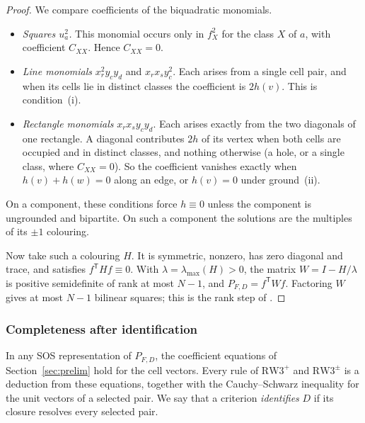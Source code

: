 \documentclass[11pt,a4paper]{article}
\theoremstyle{definition}
\newcommand{\RW}{\mathrm{RW3}^{+}}
\newcommand{\SG}{\mathrm{RW3}^{\pm}}
\begin{document}
\begin{proof}
We compare coefficients of the biquadratic monomials.
\begin{itemize}
\item \emph{Squares $u_a^2$.} This monomial occurs only in $f_X^2$ for the
      class $X$ of $a$, with coefficient $C_{XX}$. Hence $C_{XX}=0$.
\item \emph{Line monomials} $x_r^2y_cy_d$ and $x_rx_sy_c^2$. Each arises
      from a single cell pair, and when its cells lie in distinct classes
      the coefficient is $2h(v)$. This is condition~(i).
\item \emph{Rectangle monomials} $x_rx_sy_cy_d$. Each arises exactly from
      the two diagonals of one rectangle. A diagonal contributes $2h$ of its
      vertex when both cells are occupied and in distinct classes, and
      nothing otherwise (a hole, or a single class, where $C_{XX}=0$). So
      the coefficient vanishes exactly when $h(v)+h(w)=0$ along an edge,
      or $h(v)=0$ under ground~(ii).
\end{itemize}
On a component, these conditions force $h\equiv0$ unless the component is
ungrounded and bipartite. On such a component the solutions are the
multiples of its $\pm1$ colouring.

Now take such a colouring $H$. It is symmetric, nonzero, has zero diagonal
and trace, and satisfies $f^{\mathsf T}Hf\equiv0$. With
$\lambda=\lambda_{\max}(H)>0$, the matrix $W=I-H/\lambda$ is positive
semidefinite of rank at most $N-1$, and $P_{F,D}=f^{\mathsf T}Wf$.
Factoring $W$ gives at most $N-1$ bilinear squares; this is the rank step
of \cite[Lemma~2.13]{XY}.
\end{proof}

\subsubsection{Completeness after identification}

In any SOS representation of $P_{F,D}$, the coefficient equations of
Section~\ref{sec:prelim} hold for the cell vectors. Every rule of $\RW$
and $\SG$ is a deduction from these equations, together with the
Cauchy--Schwarz inequality for the unit vectors of a selected pair. We say that a criterion
\emph{identifies} $D$ if its closure resolves every selected pair.
\end{document}
